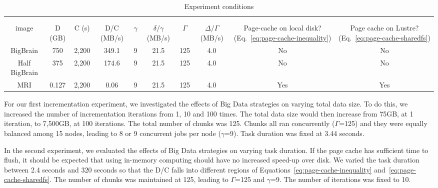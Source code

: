 \documentclass{IEEEtran}
\begin{document}
\begin{table*}
\begin{tabular}{c|ccc|cccc|cc}
\hline
  \multicolumn{10}{c}{}\\ 
 \rowcolor{headcolor}
  \multicolumn{10}{c}{Experiment 4: Image Size}\\
  \hline
  \rowcolor{headcolor}
 image  &
 D (GB) & C (s) & D/C (MB/s) &
 $\gamma$ & $\delta/\gamma$ (MB/s) & $\Gamma$ & $\Delta/\Gamma$ (MB/s)&
 \parbox{2cm}{Page-cache on local disk? (Eq.~\ref{eq:page-cache-inequality})} & \parbox{2cm}{Page cache on Lustre? (Eq.~\ref{eq:page-cache-sharedfs})}\\
 \hline
 BigBrain      & 750   & 2,200   & 349.1     & 9  & 21.5  & 125 & 4.0 &   No &  No   \\
 Half BigBrain & 375   & 2,200   & 174.6     & 9  & 21.5  & 125 & 4.0 &   No &  No   \\
 MRI           & 0.127 & 2,200   & 0.06 & 9& 21.5  & 125 & 4.0 &   Yes &  Yes  
\end{tabular}
\caption{Experiment conditions}
\label{table:experiments}
\end{table*}

For our first incrementation experiment, we investigated the effects of 
Big Data strategies on varying total data size. To do this, we 
increased the number of incrementation iterations from 1, 10 and 100 
times. The total data size would then increase from 75GB, at 1 
iteration, to 7,500GB, at 100 iterations. The total number of chunks 
was 125. Chunks all ran concurrently ($\Gamma$=125) and they were 
equally balanced among 15 nodes, leading to 8 or 9 concurrent jobs per 
node ($\gamma$=9). Task duration was fixed at 3.44 seconds.

In the second experiment, we evaluated the effects of Big Data 
strategies on varying task duration. If the page cache has sufficient 
time to flush, it should be expected that using in-memory computing 
should have no increased speed-up over disk. We varied the task 
duration between 2.4 seconds and 320 seconds so that the D/C falls into 
different regions of Equations~\ref{eq:page-cache-inequality} 
and~\ref{eq:page-cache-sharedfs}. The number of chunks was maintained 
at 125, leading to $\Gamma$=125 and $\gamma$=9. The number of iterations was
fixed to 10.
\end{document}
